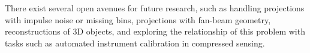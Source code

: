 \documentclass{article}
\begin{document}
There exist several open avenues for future research, such as handling projections with impulse noise or missing bins, projections with fan-beam geometry, reconstructions of 3D objects, and exploring the relationship of this problem with tasks such as automated instrument calibration in compressed sensing.


\vfill\pagebreak



\end{document}

